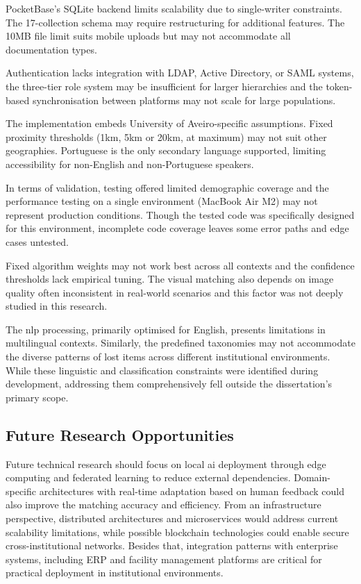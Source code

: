 PocketBase's SQLite backend limits scalability due to single-writer constraints. The 17-collection schema may require restructuring for additional features. The 10MB file limit suits mobile uploads but may not accommodate all documentation types.

Authentication lacks integration with LDAP, Active Directory, or SAML systems, the three-tier role system may be insufficient for larger hierarchies and the token-based synchronisation between platforms may not scale for large populations.

The implementation embeds University of Aveiro-specific assumptions. Fixed proximity thresholds (1km, 5km or 20km, at maximum) may not suit other geographies. Portuguese is the only secondary language supported, limiting accessibility for non-English and non-Portuguese speakers.

In terms of validation, testing offered limited demographic coverage and the performance testing on a single environment (MacBook Air M2) may not represent production conditions. Though the tested code was specifically designed for this environment, incomplete code coverage leaves some error paths and edge cases untested.

Fixed algorithm weights may not work best across all contexts and the confidence thresholds lack empirical tuning. The visual matching also depends on image quality often inconsistent in real-world scenarios and this factor was not deeply studied in this research.

The \ac{nlp} processing, primarily optimised for English, presents limitations in multilingual contexts. Similarly, the predefined taxonomies may not accommodate the diverse patterns of lost items across different institutional environments. While these linguistic and classification constraints were identified during development, addressing them comprehensively fell outside the dissertation's primary scope.

\subsection{Future Research Opportunities}

Future technical research should focus on local \ac{ai} deployment through edge computing and federated learning to reduce external dependencies. Domain-specific architectures with real-time adaptation based on human feedback could also improve the matching accuracy and efficiency. From an infrastructure perspective, distributed architectures and microservices would address current scalability limitations, while possible blockchain technologies could enable secure cross-institutional networks. Besides that, integration patterns with enterprise systems, including ERP and facility management platforms are critical for practical deployment in institutional environments.

